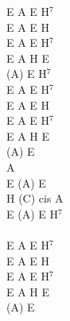 \documentclass[a5paper, 10pt]{book}
\begin{document}
\begin{minipage}[t]{0.2\textwidth}
E A E H$^7$\\
E A E H\\
E A E H$^7$\\
E A H E\\
(A) E H$^7$\\

E A E H$^7$\\
E A E H\\
E A E H$^7$\\
E A H E\\
(A) E\\

A\\
E (A) E\\
H (C) cis A\\
E (A) E H$^7$\\
\\
E A E H$^7$\\
E A E H\\
E A E H$^7$\\
E A H E\\
(A) E\\

\end{minipage}

\newpage
\end{document}
